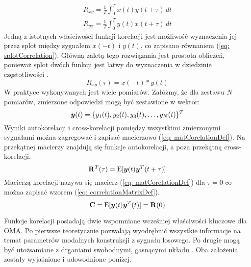 \begin{equation} \label{eq: timeAveCrosscorrelation}
	\begin{aligned}
		R_{xy} = \frac{1}{T}\int_{0}^{T}x(t)y(t+\tau) \,dt \\
		R_{yx} = \frac{1}{T}\int_{0}^{T}y(t)x(t+\tau) \,dt 
	\end{aligned}
\end{equation}
Jedną z istotnych właściwości funkcji korelacji jest możliwość wyznaczenia jej przez splot między sygnałem $x(-t)$ i $y(t)$, co zapisano równaniem (\ref{eq: splotCorrelation}). Główną zaletą tego rozwiązania jest prostota obliczeń, ponieważ splot dwóch funkcji jest łatwy do wyznaczenia w dziedzinie częstotliwości \parencite{Brincker2015}.
\begin{equation} \label{eq: splotCorrelation}
	R_{xy}(\tau)=x(-t)*y(t)
\end{equation}
W praktyce wykonywanych jest wiele pomiarów. Załóżmy, że dla zestawu $N$ pomiarów, zmierzone odpowiedzi mogą być zestawione w wektor:
\begin{equation}
	\bm{y}(t) = \{y_1(t),y_2(t),y_3(t), \hdots ,y_N(t)\}^T
\end{equation}
Wyniki autokorelacji i cross-korelacji pomiędzy wszystkimi zmierzonymi sygnałami można zagregować i zapisać macierzowo (\ref{eq: matCorelationDef}). Na przekątnej macierzy znajdują się funkcje autokorelacji, a poza przekątną cross-korelacji.
\begin{equation} \label{eq: matCorelationDef}
	\mathbf{R}^T(\tau)=\mathrm{E}[\bm{y}(t)\bm{y}^T(t+\tau)]
\end{equation}
Macierzą korelacji  nazywa się macierz (\ref{eq: matCorelationDef}) dla $\tau=0$ co można zapisać wzorem (\ref{eq: correlationMatrixDef}).
\begin{equation} \label{eq: correlationMatrixDef}
	\mathbf{C}=\mathrm{E}[\bm{y}(t)\bm{y}^T(t)]=\mathbf{R}(0)
\end{equation}

Funkcje korelacji posiadają dwie wspomniane wcześniej właściwości kluczowe dla OMA. Po pierwsze teoretycznie pozwalają wyodrębnić wszystkie informacje na temat parametrów modalnych konstrukcji z sygnału losowego. Po drugie mogą być utożsamiane z drganiami swobodnymi, gasnącymi układu \parencite{James1995}. Oba założenia zostały wyjaśnione i udowodnione poniżej.

